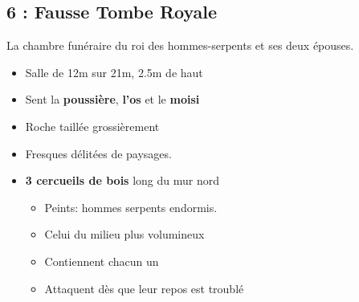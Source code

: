 \subsection{6 : Fausse Tombe Royale}\label{n1:s6}
La chambre funéraire du roi des hommes-serpents et ses deux épouses.
\begin{itemize}
  \item Salle de 12m sur 21m, 2.5m de haut
  \item Sent la \textbf{poussière}, \textbf{l’os} et le \textbf{moisi}
  \item Roche taillée grossièrement
  \item Fresques délitées de paysages.
  \item \textbf{3 cercueils de bois} long du mur nord
  \begin{itemize}
    \item Peints: hommes serpents endormis.
    \item Celui du milieu plus volumineux
    \item Contiennent chacun un \textbf{}
    \item Attaquent dès que leur repos est troublé
  \end{itemize}
\end{itemize}




